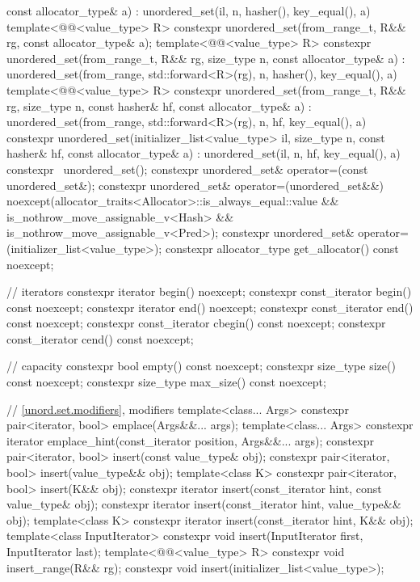 \begin{codeblock}
{{                            const allocator_type& a)
      : unordered_set(il, n, hasher(), key_equal(), a) { }
    template<@@<value_type> R>
      constexpr unordered_set(from_range_t, R&& rg, const allocator_type& a);
    template<@@<value_type> R>
      constexpr unordered_set(from_range_t, R&& rg, size_type n, const allocator_type& a)
        : unordered_set(from_range, std::forward<R>(rg), n, hasher(), key_equal(), a) { }
    template<@@<value_type> R>
      constexpr unordered_set(from_range_t, R&& rg, size_type n, const hasher& hf,
                              const allocator_type& a)
        : unordered_set(from_range, std::forward<R>(rg), n, hf, key_equal(), a) { }
    constexpr unordered_set(initializer_list<value_type> il, size_type n, const hasher& hf,
                            const allocator_type& a)
      : unordered_set(il, n, hf, key_equal(), a) { }
    constexpr ~unordered_set();
    constexpr unordered_set& operator=(const unordered_set&);
    constexpr unordered_set& operator=(unordered_set&&)
      noexcept(allocator_traits<Allocator>::is_always_equal::value &&
               is_nothrow_move_assignable_v<Hash> && is_nothrow_move_assignable_v<Pred>);
    constexpr unordered_set& operator=(initializer_list<value_type>);
    constexpr allocator_type get_allocator() const noexcept;

    // iterators
    constexpr iterator       begin() noexcept;
    constexpr const_iterator begin() const noexcept;
    constexpr iterator       end() noexcept;
    constexpr const_iterator end() const noexcept;
    constexpr const_iterator cbegin() const noexcept;
    constexpr const_iterator cend() const noexcept;

    // capacity
    constexpr bool empty() const noexcept;
    constexpr size_type size() const noexcept;
    constexpr size_type max_size() const noexcept;

    // \ref{unord.set.modifiers}, modifiers
    template<class... Args> constexpr pair<iterator, bool> emplace(Args&&... args);
    template<class... Args>
      constexpr iterator emplace_hint(const_iterator position, Args&&... args);
    constexpr pair<iterator, bool> insert(const value_type& obj);
    constexpr pair<iterator, bool> insert(value_type&& obj);
    template<class K> constexpr pair<iterator, bool> insert(K&& obj);
    constexpr iterator insert(const_iterator hint, const value_type& obj);
    constexpr iterator insert(const_iterator hint, value_type&& obj);
    template<class K> constexpr iterator insert(const_iterator hint, K&& obj);
    template<class InputIterator> constexpr void insert(InputIterator first, InputIterator last);
    template<@@<value_type> R>
      constexpr void insert_range(R&& rg);
    constexpr void insert(initializer_list<value_type>);

}}
\end{codeblock}
